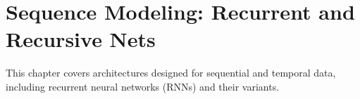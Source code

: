 
\chapter{Sequence Modeling: Recurrent and Recursive Nets}
\label{chap:sequence-modeling}

This chapter covers architectures designed for sequential and temporal data, including recurrent neural networks (RNNs) and their variants.








